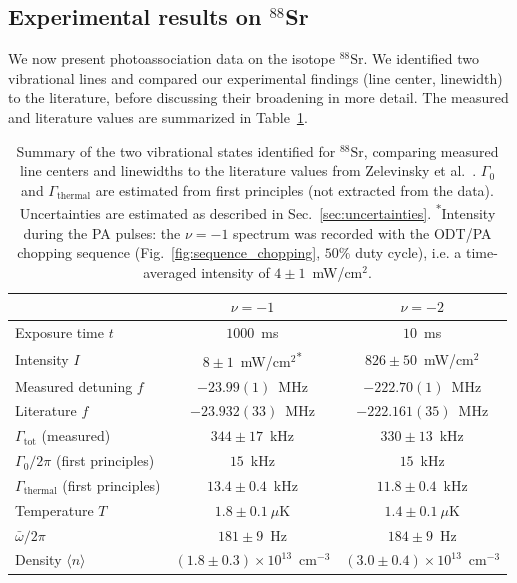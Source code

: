 \subsection{Experimental results on $^{88}$Sr}
\label{sec:88Sr_results}
We now present photoassociation data on the isotope $^{88}\text{Sr}$. We identified two
vibrational lines and compared our experimental findings (line center, linewidth) to the
literature, before discussing their broadening in more detail. The measured and
literature values are summarized in Table~\ref{tab:88Sr-lines-summary}.

\begin{table}
\centering
\begin{tabular}{lcc}
\toprule
 & $\nu=-1$ & $\nu=-2$ \\
\midrule
Exposure time $t$ & $1000$~ms & $10$~ms \\
Intensity $I$ & $8\pm1$~mW/cm$^2$\textsuperscript{*} & $826\pm50$~mW/cm$^2$ \\
\addlinespace
Measured detuning $f$ & $-23.99 (1)$~MHz & $-222.70(1)$~MHz \\
Literature $f$ \cite{zelevinsky_narrow_2006} & $-23.932(33)$~MHz & $-222.161(35)$~MHz \\
\addlinespace
$\Gamma_{\text{tot}}$ (measured) & $344 \pm 17$~kHz & $330 \pm 13$~kHz \\
$\Gamma_0/2\pi$ (first principles) & $15$~kHz & $15$~kHz \\
$\Gamma_{\text{thermal}}$ (first principles) & $13.4\pm0.4$~kHz & $11.8\pm0.4$~kHz \\
\addlinespace
Temperature $T$ & $1.8\pm0.1~\mu$K & $1.4\pm0.1~\mu$K \\
$\bar\omega/2\pi$ & $181\pm9$~Hz & $184\pm9$~Hz \\
Density $\langle n\rangle$ & $(1.8\pm0.3)\times10^{13}$~cm$^{-3}$ & $(3.0\pm0.4)\times10^{13}$~cm$^{-3}$ \\
\bottomrule
\end{tabular}
\caption{Summary of the two vibrational states identified for $^{88}\text{Sr}$, comparing
measured line centers and linewidths to the literature values from
Zelevinsky et al.~\cite{zelevinsky_narrow_2006}. $\Gamma_0$ and $\Gamma_{\text{thermal}}$
are estimated from first principles (not extracted from the data). Uncertainties are estimated as described in Sec.~\ref{sec:uncertainties}. 
\textsuperscript{*}Intensity during the PA pulses: the $\nu=-1$ spectrum was recorded with the
ODT/PA chopping sequence (Fig.~\ref{fig:sequence_chopping}, $50\%$ duty cycle), i.e. a
time-averaged intensity of $4\pm1$~mW/cm$^2$.}
\label{tab:88Sr-lines-summary}
\end{table}

